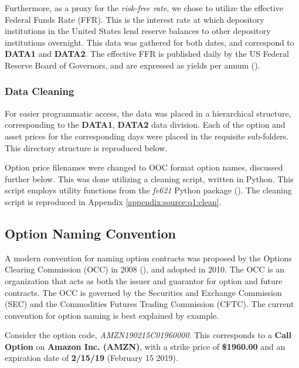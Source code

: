 \documentclass[10pt]{article}
\begin{document}
    Furthermore, as a proxy for the \textit{risk-free rate}, we chose to utilize the effective Federal Funds Rate (FFR). This is the interest rate at which depository institutions in the United States lend reserve balances to other depository institutions overnight. This data was gathered for both dates, and correspond to \textbf{DATA1} and \textbf{DATA2}. The effective FFR is published daily by the US Federal Reserve Board of Governors, and are expressed as yields per annum (\cite{BoardofGovernorsoftheFederalReserveSystem2019}).

        \subsubsection{Data Cleaning}

            For easier programmatic access, the data was placed in a hierarchical structure, corresponding to the \textbf{DATA1}, \textbf{DATA2} data division. Each of the option and asset prices for the corresponding days were placed in the requisite sub-folders. This directory structure is reproduced below.


            Option price filenames were changed to OOC format option names, discussed further below. This was done utilizing a cleaning script, written in Python. This script employs utility functions from the \textit{fe621} Python package (\cite{Weerawarana2019}). The cleaning script is reproduced in Appendix \ref{appendix:source:q1:clean}.
    
        \subsection{Option Naming Convention}

        A modern convention for naming option contracts was proposed by the Options Clearing Commission (OCC) in 2008 (\cite{OptionsSymbologyInitiative2008}), and adopted in 2010. The OCC is an organization that acts as both the issuer and guarantor for option and future contracts. The OCC is governed by the Securities and Exchange Commission (SEC) and the Commodities Futures Trading Commission (CFTC). The current convention for option naming is best explained by example.
        
        Consider the option code, \textit{AMZN190215C01960000}. This corresponds to a \textbf{Call Option} on \textbf{Amazon Inc. (AMZN)}, with a strike price of \textbf{\$1960.00} and an expiration date of \textbf{2/15/19} (February 15 2019).
        
\end{document}
